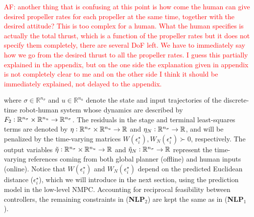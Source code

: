\textcolor{red}{AF: another thing that is confusing at this point is how come the human can give desired propeller rates for each propeller at the same time, together with the desired attitude? This is too  complex for a human. What the human specifies is actually the total thrust, which is a function of the propeller rates but it does not specify them completely, there are several DoF left. We have to immediately say how we go from the desired thrust to all the propeller rates. I guess this partially explained in the appendix, but on the one side the explanation given in appendix is not completely clear to me and on the other side I think it should be immediately explained, not delayed to the appendix. }

where $\sigma \in \mathbb{R}^{n_{\sigma}}$ and $u \in \mathbb{R}^{n_u}$ denote the state and input trajectories of the discrete-time robot-human system whose dynamics are described by $F_2 \vcentcolon \mathbb{R}^{n_{\sigma}} \times \mathbb{R}^{n_u} \rightarrow \mathbb{R}^{n_{\sigma}}$. The residuals in the stage and terminal least-squares terms are denoted by $\eta \vcentcolon \mathbb{R}^{n_{\sigma}} \times \mathbb{R}^{n_u} \rightarrow \mathbb{R}$ and $\eta_N \vcentcolon \mathbb{R}^{n_{\sigma}} \rightarrow \mathbb{R}$, and will be penalized by the time-varying matrices $W(\epsilon_i^\star), {W}_N(\epsilon_i^\star) \succ 0$, respectively. The output variables $\Tilde{\eta} \vcentcolon \mathbb{R}^{n_{\sigma}} \times \mathbb{R}^{n_u} \rightarrow \mathbb{R}$ and $\Tilde{\eta}_N \vcentcolon \mathbb{R}^{n_{\sigma}} \rightarrow \mathbb{R}$ represent the time-varying references coming from both global planner (offline) and human inputs (online). Notice that $W(\epsilon_i^\star)$ and ${W}_N(\epsilon_i^\star)$ depend on the predicted Euclidean distance ($\epsilon^\star_i$), which we will introduce in the next section, using the prediction model in the low-level NMPC. Accounting for reciprocal feasibility between controllers, the remaining constraints in (\textbf{NLP$_2$}) are kept the same as in (\textbf{NLP$_1$}). 